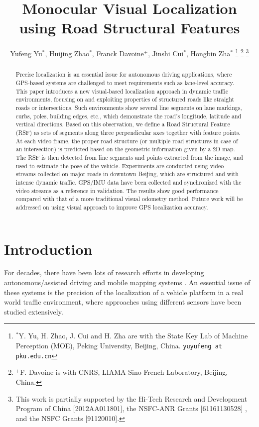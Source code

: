 \documentclass[letterpaper, 10 pt, conference]{ieeeconf}  %
\title{\LARGE \bf
Monocular Visual Localization using Road Structural Features
}
\author{Yufeng Yu$^{*}$, Huijing Zhao$^{*}$, Franck Davoine$^{+}$, Jinshi Cui$^{*}$, Hongbin Zha$^{*}$
\thanks{$^{*}$Y. Yu, H. Zhao, J. Cui and H. Zha are with the State Key Lab of Machine Perception (MOE), Peking University, Beijing, China. {\tt\small yuyufeng at pku.edu.cn}}
\thanks{$^{+}$F. Davoine is with CNRS, LIAMA Sino-French Laboratory, Beijing, China.}
\thanks{This work is partially supported by the Hi-Tech Research and Development Program of China [2012AA011801], the NSFC-ANR Grants [61161130528] , and the NSFC Grants [91120010].}
}
\begin{document}
\maketitle
\thispagestyle{empty}
\pagestyle{empty}


\begin{abstract}
Precise localization is an essential issue for autonomous driving applications, where GPS-based systems are challenged to meet requirements such as lane-level accuracy. This paper introduces a new visual-based localization approach in dynamic traffic environments, focusing on and exploiting properties of structured roads like straight roads or intersections. Such environments show several line segments on lane markings, curbs, poles, building edges, etc., which demonstrate the road's longitude, latitude and vertical directions. Based on this observation, we define a Road Structural Feature (RSF) as sets of segments along three perpendicular axes together with feature points. At each video frame, the proper road structure (or multiple road structures in case of an intersection) is predicted based on the geometric information given by a 2D map. The RSF is then detected from line segments and points extracted from the image, and used to estimate the pose of the vehicle. Experiments are conducted using video streams collected on major roads in downtown Beijing, which are structured and with intense dynamic traffic. GPS/IMU data have been collected and synchronized with the video streams as a reference in validation. The results show good performance compared with that of a more traditional visual odometry method. Future work will be addressed on using visual approach to improve GPS localization accuracy.
\end{abstract}


\section{Introduction}
\label{sec_introduction}

For decades, there have been lots of research efforts in developing autonomous/assisted driving and mobile mapping systems \cite{urmson2008autonomous}. An essential issue of these systems is the precision of the localization of a vehicle platform in a real world traffic environment, where approaches using different sensors have been studied extensively.
\end{document}
